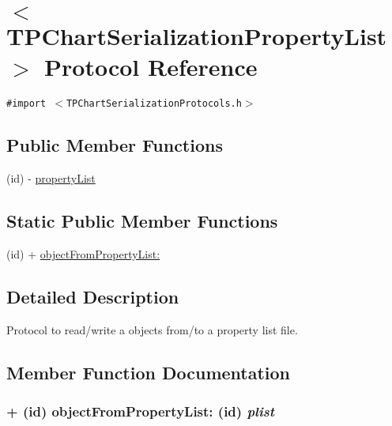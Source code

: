 \hypertarget{protocol_t_p_chart_serialization_property_list-p}{
\section{$<$ TPChartSerializationPropertyList $>$ Protocol Reference}
\label{protocol_t_p_chart_serialization_property_list-p}
}
{\tt \#import $<$TPChartSerializationProtocols.h$>$}

\subsection*{Public Member Functions}
\begin{CompactItemize}
\item 
(id) - \hyperlink{protocol_t_p_chart_serialization_property_list-p_04773baf998426793bf2e587f4331927}{propertyList}
\end{CompactItemize}
\subsection*{Static Public Member Functions}
\begin{CompactItemize}
\item 
(id) + \hyperlink{protocol_t_p_chart_serialization_property_list-p_1c253fc328b5a9d3a5afacbb69cd20f5}{objectFromPropertyList:}
\end{CompactItemize}


\subsection{Detailed Description}
Protocol to read/write a objects from/to a property list file. 

\subsection{Member Function Documentation}
\hypertarget{protocol_t_p_chart_serialization_property_list-p_1c253fc328b5a9d3a5afacbb69cd20f5}{
\subsubsection[{objectFromPropertyList:}]{\setlength{\rightskip}{0pt plus 5cm}+ (id) objectFromPropertyList: (id) {\em plist}}}
\label{protocol_t_p_chart_serialization_property_list-p_1c253fc328b5a9d3a5afacbb69cd20f5}


